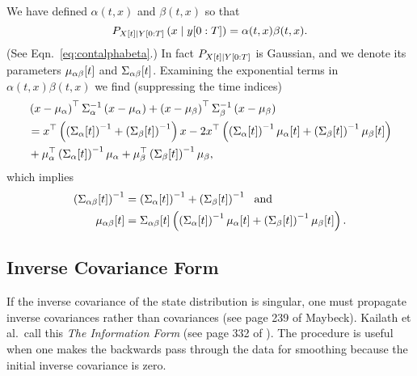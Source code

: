We have defined $\alpha(t,x)$ and $\beta(t,x)$ so that
\begin{equation*}
   P_{{X}{[t]}\mid Y[0:T]} \left(x\mid y[0:T] \right) =
   \alpha(t,x) \beta(t,x).
\end{equation*}
(See Eqn.~\eqref{eq:contalphabeta}.)  In fact
$P_{{X}{[t]}\mid Y[0:T]}$ is Gaussian, and we denote its parameters
${\mu_{\alpha \beta}}{[t]}$ and ${\Sigma_{\alpha \beta}}{[t]}$.
Examining the exponential terms in $\alpha(t,x) \beta(t,x)$ we find
(suppressing the time indices)
\begin{align*}
  &\left( x - \mu_\alpha \right)^\top \Sigma_\alpha^{-1} \left( x
    - \mu_\alpha \right) + \left( x - \mu_\beta \right)^\top
  \Sigma_\beta^{-1} \left( x - \mu_\beta \right)\\
  & = x^\top \left( \left( {\Sigma_{\alpha}}{[t]} \right)^{-1} + \left(
      {\Sigma_{\beta}}{[t]} \right)^{-1} \right) x - 2x^\top
  \left( \left( {\Sigma_{\alpha}}{[t]} \right)^{-1}
  {\mu_{\alpha}}{[t]} + \left( {\Sigma_{\beta}}{[t]} \right)^{-1}
  {\mu_{\beta}}{[t]} \right) \\
& + \mu_\alpha^\top  \left(
  {\Sigma_{\alpha}}{[t]} \right)^{-1} \mu_\alpha +
  \mu_\beta^\top  \left( {\Sigma_{\beta}}{[t]} \right)^{-1}
  \mu_\beta ,
\end{align*}
which implies
\begin{subequations}
  \begin{align}
    \left( {\Sigma_{\alpha \beta}}{[t]} \right)^{-1} &= \left(
      {\Sigma_{\alpha}}{[t]} \right)^{-1} + \left(
      {\Sigma_{\beta}}{[t]} \right)^{-1} ~\text{ and} \\
    {\mu_{\alpha \beta}}{[t]} &=
    {\Sigma_{\alpha \beta}}{[t]} \left( \left(
        {\Sigma_{\alpha}}{[t]} \right)^{-1} {\mu_{\alpha}}{[t]} +
      \left( {\Sigma_{\beta}}{[t]} \right)^{-1} {\mu_{\beta}}{[t]}
    \right).
\end{align}
\end{subequations}

\subsection{Inverse Covariance Form}
\label{sec:DetailInverse}

 If the inverse covariance of the state distribution is singular, one
 must propagate inverse covariances rather than covariances (see page
 239 of Maybeck\cite{Maybeck79}).  Kailath et al.\ call this \emph{The
   Information Form} (see page 332 of \cite{KSH00}).
  The procedure is useful when one makes the
 backwards pass through the data for smoothing because the initial
 inverse covariance is zero.

